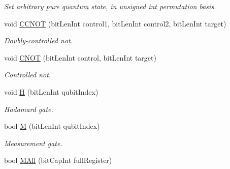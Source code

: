 \begin{DoxyCompactItemize}
\begin{DoxyCompactList}\small\item\em Set arbitrary pure quantum state, in unsigned int permutation basis. \end{DoxyCompactList}\item 
void \hyperlink{classQrack_1_1Register_a8f80b38a9a0dd924be1045c18ebaac3e}{C\+C\+N\+OT} (bit\+Len\+Int control1, bit\+Len\+Int control2, bit\+Len\+Int target)\hypertarget{classQrack_1_1Register_a8f80b38a9a0dd924be1045c18ebaac3e}{}\label{classQrack_1_1Register_a8f80b38a9a0dd924be1045c18ebaac3e}

\begin{DoxyCompactList}\small\item\em Doubly-\/controlled not. \end{DoxyCompactList}\item 
void \hyperlink{classQrack_1_1Register_a45aac758ee13e22b52c82843829e0577}{C\+N\+OT} (bit\+Len\+Int control, bit\+Len\+Int target)\hypertarget{classQrack_1_1Register_a45aac758ee13e22b52c82843829e0577}{}\label{classQrack_1_1Register_a45aac758ee13e22b52c82843829e0577}

\begin{DoxyCompactList}\small\item\em Controlled not. \end{DoxyCompactList}\item 
void \hyperlink{classQrack_1_1Register_ac08a20a80142c5f0f832ce629c5186c0}{H} (bit\+Len\+Int qubit\+Index)\hypertarget{classQrack_1_1Register_ac08a20a80142c5f0f832ce629c5186c0}{}\label{classQrack_1_1Register_ac08a20a80142c5f0f832ce629c5186c0}

\begin{DoxyCompactList}\small\item\em Hadamard gate. \end{DoxyCompactList}\item 
bool \hyperlink{classQrack_1_1Register_a57b867997afd9d60ee624b582af16b4a}{M} (bit\+Len\+Int qubit\+Index)\hypertarget{classQrack_1_1Register_a57b867997afd9d60ee624b582af16b4a}{}\label{classQrack_1_1Register_a57b867997afd9d60ee624b582af16b4a}

\begin{DoxyCompactList}\small\item\em Measurement gate. \end{DoxyCompactList}\item 
bool \hyperlink{classQrack_1_1Register_a7cf0d9ce7f529fff1c396e688c633a5c}{M\+All} (bit\+Cap\+Int full\+Register)\hypertarget{classQrack_1_1Register_a7cf0d9ce7f529fff1c396e688c633a5c}{}\label{classQrack_1_1Register_a7cf0d9ce7f529fff1c396e688c633a5c}


\end{DoxyCompactItemize}
